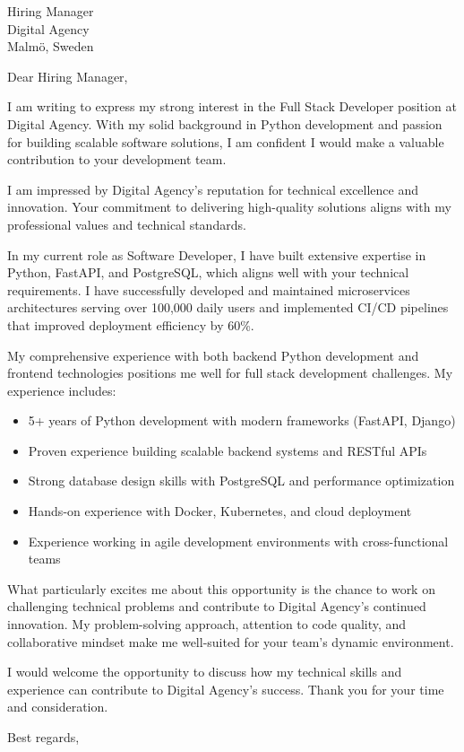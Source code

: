 \documentclass[11pt,a4paper]{letter}
\begin{document}
\begin{letter}{Hiring Manager \\ Digital Agency \\ Malmö, Sweden}

\opening{Dear Hiring Manager,}

I am writing to express my strong interest in the Full Stack Developer position at Digital Agency. With my solid background in Python development and passion for building scalable software solutions, I am confident I would make a valuable contribution to your development team.

I am impressed by Digital Agency's reputation for technical excellence and innovation. Your commitment to delivering high-quality solutions aligns with my professional values and technical standards.

In my current role as Software Developer, I have built extensive expertise in Python, FastAPI, and PostgreSQL, which aligns well with your technical requirements. I have successfully developed and maintained microservices architectures serving over 100,000 daily users and implemented CI/CD pipelines that improved deployment efficiency by 60\%.

My comprehensive experience with both backend Python development and frontend technologies positions me well for full stack development challenges. My experience includes:

\begin{itemize}
\item 5+ years of Python development with modern frameworks (FastAPI, Django)
\item Proven experience building scalable backend systems and RESTful APIs
\item Strong database design skills with PostgreSQL and performance optimization
\item Hands-on experience with Docker, Kubernetes, and cloud deployment
\item Experience working in agile development environments with cross-functional teams
\end{itemize}

What particularly excites me about this opportunity is the chance to work on challenging technical problems and contribute to Digital Agency's continued innovation. My problem-solving approach, attention to code quality, and collaborative mindset make me well-suited for your team's dynamic environment.

I would welcome the opportunity to discuss how my technical skills and experience can contribute to Digital Agency's success. Thank you for your time and consideration.

\closing{Best regards,}

\end{letter}
\end{document}
